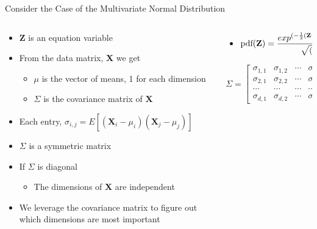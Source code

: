 \documentclass[aspectratio=169]{beamer}
\begin{document}
\begin{frame}{Consider the Case of the  Multivariate Normal Distribution}
\begin{columns}[T]
\begin{column}{0.6\textwidth}
\begin{itemize}
	\item \textbf{Z} is an equation variable
	\item From the data matrix, \textbf{X} we get
	\begin{itemize}
		\item \textbf{$\mu$} is the vector of means, 1 for each dimension
		\item  $\Sigma$  is the covariance matrix of $\textbf{X}$
	\end{itemize}
	\item Each entry, $\sigma_{i,j} = E[(\textbf{X}_i - \mu_i)(\textbf{X}_j- \mu_j)]$
	\item $\Sigma$ is a symmetric matrix
	\item If $\Sigma$ is diagonal
	\begin{itemize}
		\item The dimensions of \textbf{X} are independent
	\end{itemize}
	\item We leverage the covariance matrix to figure out which dimensions are most important
\end{itemize}
\end{column}
\begin{column}{0.4\textwidth}
\begin{itemize}
	\item[] 
	$$\textrm{pdf(\textbf{Z})} = \frac{exp^{(-\frac{1}{2}(\textbf{Z} - \pmb{\mu})^T\Sigma^{-1}(\textbf{Z} - \pmb{\mu}))}}{\sqrt{(2\pi)^k|\Sigma|}}$$	
\end{itemize}
\vspace{2em}
\[ \Sigma = 
               \left[\begin{array}{cccc}
	\sigma_{1,1} & \sigma_{1,2} & \cdots & \sigma_{1,d}	\\
 	\sigma_{2,1} & \sigma_{2,2} & \cdots & \sigma_{2,d}	\\
	\cdots & \cdots & \cdots &\cdots	\\
	\sigma_{d,1} & \sigma_{d,2} & \cdots & \sigma_{d,d}	
\end{array}\right]
\]\end{column}
\end{columns}


\end{frame}
\end{document}
